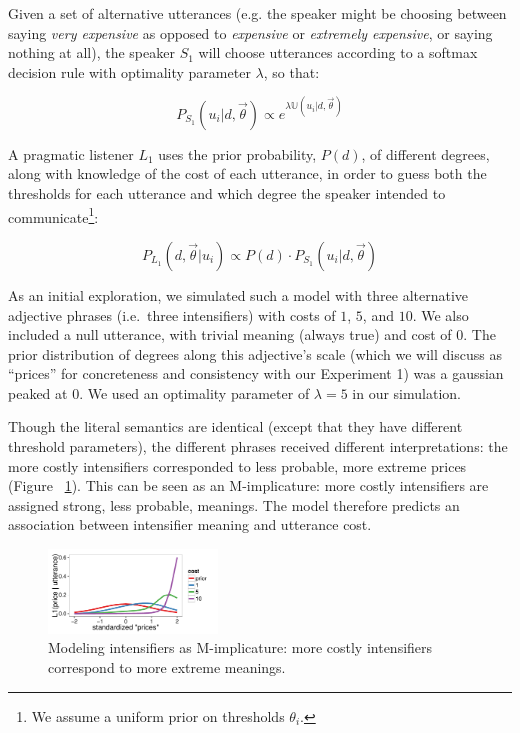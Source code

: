 \documentclass[10pt,letterpaper]{article}
\newcommand{\w}[1]{\emph{#1}}
\begin{document}
Given a set of alternative utterances (e.g. the speaker might be choosing between saying \w{very expensive} as opposed to \w{expensive} or \w{extremely expensive}, or saying nothing at all), the speaker $S_1$ will choose utterances according to a softmax decision rule \cite{sutton} with optimality parameter $\lambda$, so that:

$$ P_{S_1}(u_i | d, \vec{\theta}) \propto e^{\lambda \mathbb{U}(u_i | d, \vec{\theta})} $$

A pragmatic listener $L_1$ uses the prior probability, $P(d)$, of different degrees, along with knowledge of the cost of each utterance, in order to guess both the thresholds for each utterance and which degree the speaker intended to communicate\footnote{We assume a uniform prior on thresholds $\theta_i$.}:

$$ P_{L_1}(d, \vec{\theta} | u_i) \propto P(d) \cdot P_{S_1}(u_i | d, \vec{\theta}) $$

As an initial exploration, we simulated such a model with three alternative adjective phrases (i.e.~three intensifiers) with costs of $1$, $5$, and $10$. We also included a null utterance, with trivial meaning (always true) and cost of $0$. The prior distribution of degrees along this adjective's scale (which we will discuss as ``prices'' for concreteness and consistency with our Experiment 1) was a gaussian peaked at $0$.
We used an optimality parameter of $\lambda=5$ in our simulation. 

Though the literal semantics are identical (except that they have different threshold parameters), the different phrases received different interpretations: the more costly intensifiers corresponded to less probable, more extreme prices (Figure ~\ref{model}). This can be seen as an M-implicature: more costly intensifiers are assigned strong, less probable, meanings. 
The model therefore predicts an association between intensifier meaning and utterance cost.

\begin{figure}[ht]
\begin{center}
\includegraphics[width=0.4\textwidth]{model_results.pdf}
\end{center}
\caption{Modeling intensifiers as M-implicature: more costly intensifiers correspond to more extreme meanings.} 
\label{model}
\end{figure}
\end{document}
